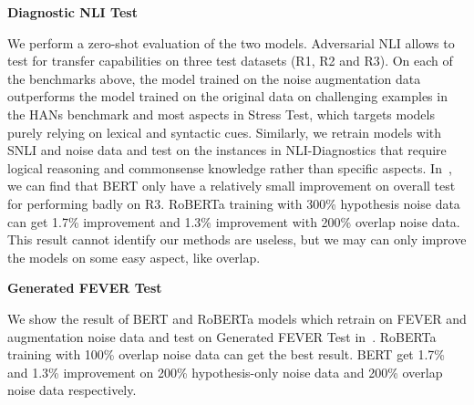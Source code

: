 \noindent\textbf{Diagnostic NLI Test} 

We perform a zero-shot evaluation of the two models. Adversarial NLI allows to test for transfer
capabilities on three test datasets (R1, R2 and R3).
On each of the benchmarks above, the model trained on the noise augmentation 
data outperforms
the model trained on the original data on challenging examples in the HANs benchmark and 
most aspects in Stress Test, which
targets models purely relying on lexical and syntactic cues. 
Similarly, we retrain models with SNLI and noise data and test 
on the instances in NLI-Diagnostics that require logical reasoning and 
commonsense knowledge rather than specific aspects. 
In~, we can find that BERT only have a 
relatively small improvement on overall test for performing badly on R3. 
RoBERTa training with 300\% hypothesis noise data can get 1.7\% 
improvement and 1.3\% improvement with 200\% overlap noise data. 
This result cannot identify our methods are useless, but we may can only 
improve the models on some easy aspect, like overlap. 

\noindent\textbf{Generated FEVER Test} 

We show the result of BERT and RoBERTa models which retrain on FEVER and 
augmentation noise data and test on Generated FEVER Test in~. 
 RoBERTa training with 100\% overlap noise data can get the best result. BERT get 1.7\% and 1.3\% 
 improvement on 200\% hypothesis-only noise data and 200\% overlap noise data respectively.
 
